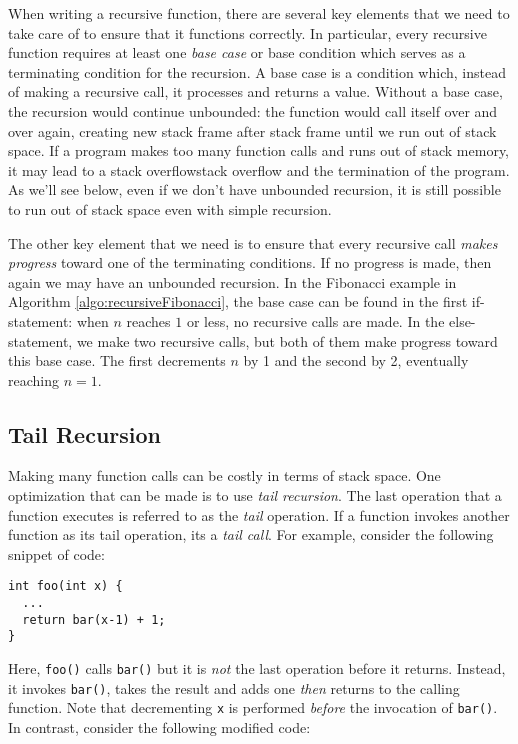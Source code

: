 When writing a recursive function, there are several key elements that
we need to take care of to ensure that it functions correctly.  In particular, 
every recursive function requires at least one \emph{base case} or
base condition which serves as a terminating condition for the recursion.
A base case is a condition which, instead of making a recursive call, 
it processes and returns a value.  Without a base case, the recursion would 
continue unbounded: the  function would call itself over and over again, 
creating new stack frame after stack frame until we run out of stack space.  
If a program makes too many function calls and runs out of stack memory, 
it may lead to a \gls{stack overflow}\gls{stack overflow} and the 
termination of the program.  As we'll see below, even if we don't have
unbounded recursion, it is still possible to run out of stack space
even with simple recursion.

The other key element that we need is to ensure that every recursive
call \emph{makes progress} toward one of the terminating conditions.  
If no progress is made, then again we may have an unbounded recursion.
In the Fibonacci example in Algorithm \ref{algo:recursiveFibonacci}, the
base case can be found in the first if-statement: when $n$ reaches $1$
or less, no recursive calls are made.  In the else-statement, we make
two recursive calls, but both of them make progress toward this base 
case.  The first decrements $n$ by 1 and the second by 2, eventually
reaching $n = 1$.

\subsection{Tail Recursion}

Making many function calls can be costly in terms of stack space.  One
optimization that can be made is to use \emph{tail recursion}.  The last
operation that a function executes is referred to as the \emph{tail}
operation.  If a function invokes another function as its tail operation, 
its a \emph{tail call}.  For example, consider the following snippet of
code:

\begin{verbatim}
int foo(int x) {
  ...
  return bar(x-1) + 1;
}
\end{verbatim}

Here, \texttt{foo()} calls \texttt{bar()} but it is 
\emph{not} the last operation before it returns.  Instead, it invokes
\texttt{bar()}, takes the result and adds one \emph{then} 
returns to the calling function.  Note that decrementing \texttt{x}
is performed \emph{before} the invocation of \texttt{bar()}.
In contrast, consider the following modified code:

